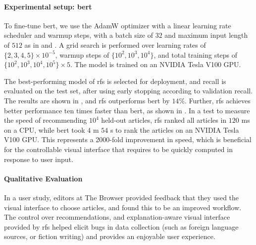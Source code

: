 \paragraph{Experimental setup: \acrshort{bert}} To fine-tune \acrshort{bert}, we use the AdamW optimizer with a linear learning rate scheduler and warmup steps, with a batch size of $32$ and maximum input length of $512$ as in \citet{devlin2019bert:} and \citet{wolf2019huggingfaces}. A grid search is performed over learning rates of $\{2, 3, 4, 5\} \times 10^{-5}$, warmup steps of $\{10^2, 10^3, 10^4\}$, and total training steps of $\{10^2, 10^3, 10^4, 10^5\} \times 5$. The model is trained on an NVIDIA Tesla V100 GPU.

The best-performing model of \gls{rfs} is selected for deployment, and recall is evaluated on the test set, after using early stopping according to validation recall. The results are shown in , and \gls{rfs} outperforms \acrshort{bert} by $14\%$. Further, \gls{rfs} achieves better performance ten times faster than \acrshort{bert}, as shown in . In a test to measure the speed of recommending $10^4$ held-out articles, \gls{rfs} ranked all articles in $120$ ms on a CPU, while \acrshort{bert} took $4$ m $54$ s to rank the articles on an NVIDIA Tesla V100 GPU. This represents a 2000-fold improvement in speed, which is beneficial for the controllable visual interface that requires  to be quickly computed in response to user input.




\paragraph{Qualitative Evaluation} In a user study, editors at The Browser provided feedback that they used the visual interface to choose articles, and found this to be an improved workflow. The control over recommendations, and explanation-aware visual interface provided by \gls{rfs} helped elicit bugs in data collection (such as foreign language sources, or fiction writing) and provides an enjoyable user experience.